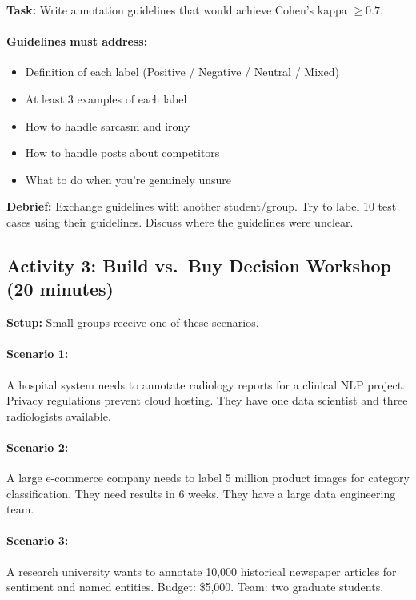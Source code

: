 \textbf{Task:} Write annotation guidelines that would achieve Cohen's kappa $\geq 0.7$.

\paragraph{Guidelines must address:}
\begin{itemize}
    \item Definition of each label (Positive / Negative / Neutral / Mixed)
    \item At least 3 examples of each label
    \item How to handle sarcasm and irony
    \item How to handle posts about competitors
    \item What to do when you're genuinely unsure
\end{itemize}

\textbf{Debrief:} Exchange guidelines with another student/group. Try to label 10 test cases using their guidelines. Discuss where the guidelines were unclear.

\subsection{Activity 3: Build vs.\ Buy Decision Workshop (20 minutes)}

\textbf{Setup:} Small groups receive one of these scenarios.

\paragraph{Scenario 1:} A hospital system needs to annotate radiology reports for a clinical NLP project. Privacy regulations prevent cloud hosting. They have one data scientist and three radiologists available.

\paragraph{Scenario 2:} A large e-commerce company needs to label 5 million product images for category classification. They need results in 6 weeks. They have a large data engineering team.

\paragraph{Scenario 3:} A research university wants to annotate 10,000 historical newspaper articles for sentiment and named entities. Budget: \$5,000. Team: two graduate students.

